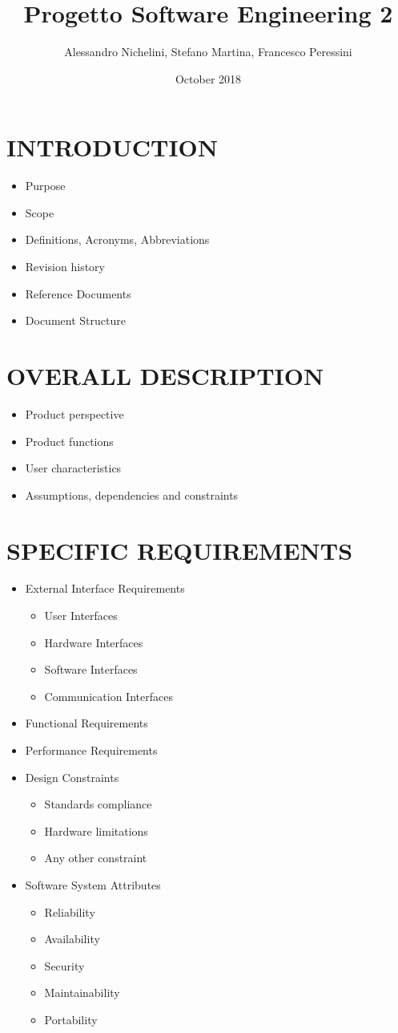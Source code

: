 \documentclass{article}
\title{Progetto Software Engineering 2}
\author{Alessandro Nichelini, Stefano Martina, Francesco Peressini}
\date{October 2018}
\begin{document}
\maketitle

\section{INTRODUCTION}
\begin{itemize}
\item Purpose
\item Scope
\item Definitions, Acronyms, Abbreviations
\item Revision history
\item Reference Documents
\item Document Structure
\end{itemize}


\section{OVERALL DESCRIPTION}
\begin{itemize}
\item Product perspective
\item Product functions
\item User characteristics
\item Assumptions, dependencies and constraints
\end{itemize}

\section{SPECIFIC REQUIREMENTS}
\begin{itemize}
	\item External Interface Requirements
		\begin{itemize}
			\item User Interfaces
			\item Hardware Interfaces
			\item Software Interfaces
			\item Communication Interfaces
		\end{itemize}
	\item Functional Requirements
	\item Performance Requirements
	\item Design Constraints
		\begin{itemize}
			\item Standards compliance
			\item Hardware limitations
			\item Any other constraint
		\end{itemize}
	\item Software System Attributes
		\begin{itemize}
			\item Reliability
			\item Availability
			\item Security
			\item Maintainability
			\item Portability
		\end{itemize}
\end{itemize}
\end{document}
